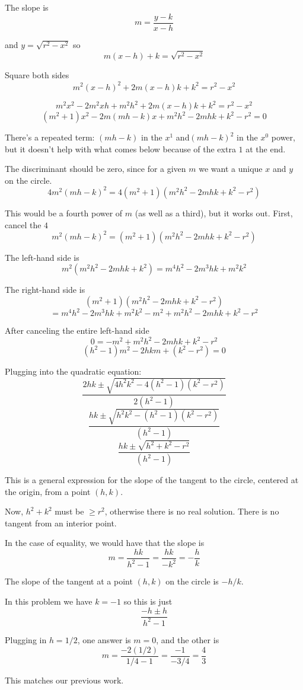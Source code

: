 \documentclass[11pt, oneside]{article}
\begin{document}
The slope is
\[ m = \frac{y - k}{x - h} \]

and $y = \sqrt{r^2 - x^2}$ so
\[ m(x - h) + k = \sqrt{r^2 - x^2} \]

Square both sides
\[ m^2(x - h)^2 + 2m(x-h)k + k^2 = r^2 - x^2 \]

\[ m^2x^2 - 2m^2xh + m^2h^2 + 2m(x-h)k + k^2 = r^2 - x^2 \]
\[ (m^2 + 1) x^2 - 2m(mh - k) x + m^2h^2 - 2mhk + k^2 - r^2 = 0 \]

There's a repeated term:  $(mh - k)$ in the $x^1$ and$(mh - k)^2$ in the $x^0$ power, but it doesn't help with what comes below because of the extra $1$ at the end.

The discriminant should be zero, since for a given $m$ we want a unique $x$ and $y$ on the circle.
\[ 4m^2(mh - k)^2 = 4(m^2 + 1)(m^2h^2 - 2mhk + k^2 - r^2) \]

This would be a fourth power of $m$ (as well as a third), but it works out.  First, cancel the $4$
\[ m^2(mh - k)^2 = (m^2 + 1)(m^2h^2 - 2mhk + k^2 - r^2) \]

The left-hand side is
\[ m^2(m^2h^2 - 2mhk + k^2) = m^4h^2 - 2m^3hk + m^2k^2 \]

The right-hand side is
\[ (m^2 + 1)(m^2h^2 - 2mhk + k^2 - r^2) \]
\[ = m^4h^2 - 2m^3hk + m^2 k^2 - m^2 + m^2h^2 - 2mhk + k^2 - r^2 \]

After canceling the entire left-hand side
\[ 0 = -m^2 + m^2h^2 - 2mhk + k^2 - r^2 \]
\[ (h^2 - 1)m^2  - 2hkm + (k^2 - r^2) = 0 \]

Plugging into the quadratic equation:
\[ \frac{2hk \pm \sqrt{4h^2k^2 - 4(h^2 - 1)(k^2 - r^2)}}{2(h^2 - 1)} \]
\[ \frac{hk \pm \sqrt{h^2k^2 - (h^2 - 1)(k^2 - r^2)}}{(h^2 - 1)} \]
\[ \frac{hk \pm \sqrt{h^2 + k^2 - r^2}}{(h^2 - 1)} \]

This is a general expression for the slope of the tangent to the circle, centered at the origin, from a point $(h,k)$.

Now, $h^2 + k^2$ must be $ \ge r^2$, otherwise there is no real solution.  There is no tangent from an interior point.

In the case of equality, we would have that the slope is 
\[ m = \frac{hk}{h^2 - 1} = \frac{hk}{-k^2} = -\frac{h}{k} \]

The slope of the tangent at a point $(h,k)$ on the circle is $-h/k$.

In this problem we have $k = -1$ so this is just
\[ \frac{-h \pm h}{h^2 - 1} \]

Plugging in $h = 1/2$, one answer is $m=0$, and the other is
\[ m = \frac{-2(1/2)}{1/4 - 1} = \frac{-1}{-3/4} = \frac{4}{3}  \]

This matches our previous work.
\end{document}
